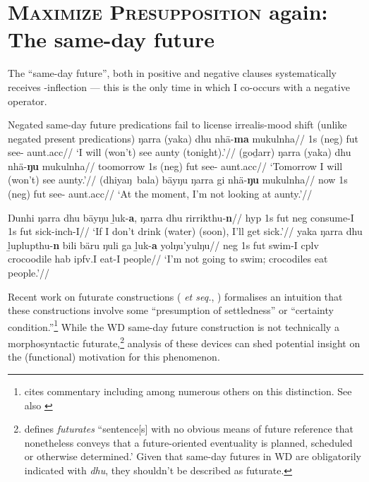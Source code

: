 \section[\textsc{\textit{MaxPresupp 2}}: The same-day future]{\textsc{Maximize Presupposition} again:\\The same-day future}\label{yolngu-sdf}


The ``same-day future'', both in positive and negative clauses systematically receives \I-inflection --- this is the only time in which \gls{I} co-occurs with a negative operator.

\pex Negated same-day future predications fail to license irrealis-mood shift (unlike negated present predications)\trailingcitation{[AW~20190501]}
\a\begingl\gla ŋarra (yaka) dhu nhä-\textbf{ma} mukulnha//
\glb 1s (\gls{neg}) \gls{fut} see-\I{} aunt.\gls{acc}//
\glft `I will (won't) see aunty (tonight).'//\endgl
\a \begingl\gla (goḏarr) ŋarra (yaka) dhu nhä-\textbf{ŋu} mukulnha//
\glb toomorrow 1s (\gls{neg}) \gls{fut} see-\II{} aunt.\gls{acc}//
\glft `Tomorrow I will (won't) see aunty.'//\endgl
\a\begingl\gla (dhiyaŋ~bala) bäyŋu ŋarra gi nhä-\textbf{ŋu} mukulnha//
\glb now 1s (\gls{neg}) \gls{fut} see-\II{} aunt.\gls{acc}//
\glft `At the moment, I'm not looking at aunty.'//\endgl
\xe

\pex
\a\begingl\gla Ŋunhi ŋarra dhu bäyŋu ḻuk-\textbf{a}, ŋarra dhu rirrikthu-\textbf{n}//
\glb \gls{hyp} 1s \gls{fut} \gls{neg} consume-\gls{I} 1s \gls{fut} sick-\gls{inch}-\gls{I}//
\glft`If I don't drink (water) (soon), I'll get sick.'\trailingcitation{[AW~20190409]}//
\endgl
\a\begingl\gla yaka ŋarra dhu ḻuplupthu-\textbf{n} bili bäru ŋuli ga ḻuk-\textbf{a} yolŋu'yulŋu//
\glb \gls{neg} 1s \gls{fut} swim-\gls{I} \gls{cplv} crocoodile \gls{hab} \gls{ipfv}.\gls{I} eat-\gls{I} people//
\glft`I'm not going to swim; crocodiles eat people.'\trailingcitation{[AW~20190428]}//
\endgl\xe

Recent work on futurate constructions (\citealp[see e.g.,][]{Copley2009,Copley2008a} \textit{et seq.}, \citealp{Kaufmann2002,Kaufmann2005}) formalises an intuition that these constructions involve some ``presumption of settledness'' or ``certainty condition.''\footnote{\citet{Kaufmann2002} cites commentary including \citet{Dowty1979,Comrie1985} among numerous others on this distinction. See also \citet[note 1]{Copley2008a}} While the WD same-day future construction is not technically a morphosyntactic futurate,\footnote{\citet[261]{Copley2008a} defines \textit{futurates} ``sentence[s] with no obvious means of future reference that nonetheless conveys that a future-oriented eventuality is planned, scheduled or otherwise determined.' Given that same-day futures in WD are obligatorily indicated with \textit{dhu}, they shouldn't be described as futurate.} analysis of these devices can shed potential insight on the (functional) motivation for this phenomenon.

